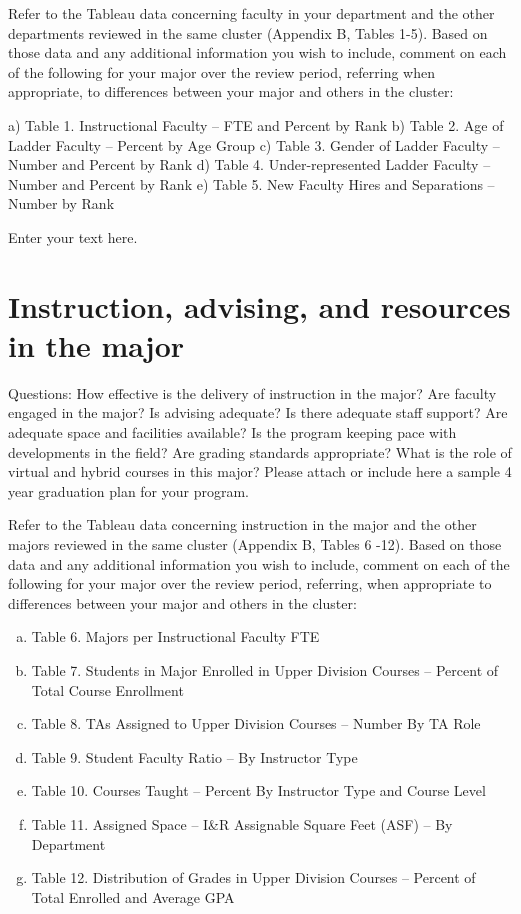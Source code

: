 \documentclass[12pt]{article}
\begin{document}
Refer to the Tableau data concerning faculty in your department and the other departments reviewed in the same cluster (Appendix B, Tables 1-5). Based on those data and any additional information you wish to include, comment on each of the following for your major over the review period, referring when appropriate, to differences between your major and others in the cluster:

    a) Table 1.  Instructional Faculty – FTE and Percent by Rank 
    b) Table 2.  Age of Ladder Faculty – Percent by Age Group 
    c) Table 3.  Gender of Ladder Faculty – Number and Percent by Rank 
    d) Table 4.  Under-represented Ladder Faculty – Number and Percent by Rank 
    e) Table 5.  New Faculty Hires and Separations – Number by Rank 

Enter your text here.


\section{Instruction, advising, and resources in the major}
Questions: How effective is the delivery of instruction in the major? Are faculty engaged in the major? Is advising adequate? Is there adequate staff support? Are adequate space and facilities available? Is the program keeping pace with developments in the field? Are grading standards appropriate? What is the role of virtual and hybrid courses in this major? Please attach or include here a sample 4 year graduation plan for your program.

Refer to the Tableau data concerning instruction in the major and the other majors reviewed in the same cluster (Appendix B, Tables 6 -12). Based on those data and any additional information you wish to include, comment on each of the following for your major over the review period, referring, when appropriate to differences between your major and others in the cluster:
\begin{enumerate}[a)]
 \item Table 6.  Majors per Instructional Faculty FTE
 \item Table 7.  Students in Major Enrolled in Upper Division Courses – Percent of Total Course Enrollment 
 \item Table 8.  TAs Assigned to Upper Division Courses – Number By TA Role 
 \item Table 9.  Student Faculty Ratio – By Instructor Type 
 \item Table 10.  Courses Taught – Percent By Instructor Type and Course Level 
 \item Table 11.  Assigned Space – I\&R Assignable Square Feet (ASF) – By Department
 \item Table 12.  Distribution of Grades in Upper Division Courses – Percent of Total Enrolled and Average GPA 
\end{enumerate}
   
\end{document}
